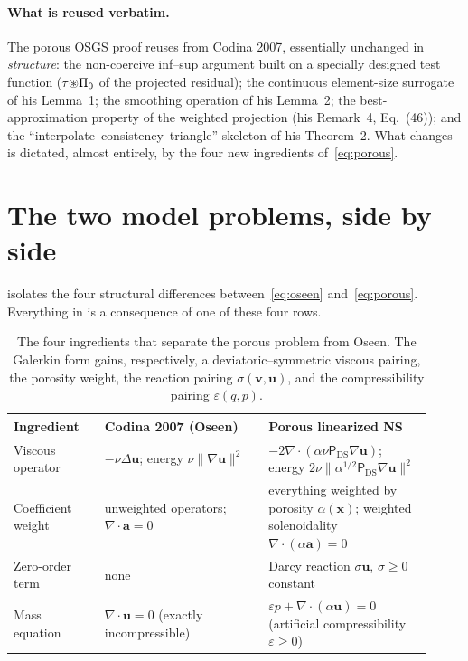 \documentclass[11pt]{article}
\theoremstyle{remark}
\newcommand{\bu}{\boldsymbol{u}}
\newcommand{\bv}{\boldsymbol{v}}
\newcommand{\ba}{\boldsymbol{a}}
\newcommand{\ViscProj}{\mathsf{P}_{\mathrm{DS}}}
\newcommand{\norm}[1]{\lVert #1 \rVert}
\newcommand{\smul}{\circledast}
\begin{document}
\paragraph{What is reused verbatim.}
The porous OSGS proof reuses from Codina 2007, essentially unchanged in \emph{structure}:
the non-coercive inf--sup argument built on a specially designed test function
($\tau\smash{\smul}\Pi_0$ of the projected residual); the continuous element-size surrogate
of his Lemma~1; the smoothing operation of his Lemma~2; the best-approximation property of
the weighted projection (his Remark~4, Eq.~(46)); and the ``interpolate--consistency--triangle''
skeleton of his Theorem~2. What changes is dictated, almost entirely, by the four new
ingredients of~\cref{eq:porous}.

\section{The two model problems, side by side}
\label{sec:models}

 isolates the four structural differences between~\cref{eq:oseen}
and~\cref{eq:porous}. Everything in  is a consequence of
one of these four rows.

\begin{table}[htbp]
\centering
\small
\renewcommand{\arraystretch}{1.35}
\begin{tabular}{@{}p{0.20\linewidth}p{0.36\linewidth}p{0.36\linewidth}@{}}
\toprule
Ingredient & Codina 2007 (Oseen) & Porous linearized NS \\
\midrule
Viscous operator
 & $-\nu\Delta\bu$; energy $\nu\norm{\nabla\bu}^2$
 & $-2\nabla\cdot(\alpha\nu\ViscProj\nabla\bu)$; energy $2\nu\norm{\alpha^{1/2}\ViscProj\nabla\bu}^2$ \\
Coefficient weight
 & unweighted operators; $\nabla\cdot\ba=0$
 & everything weighted by porosity $\alpha(\boldsymbol x)$; weighted solenoidality $\nabla\cdot(\alpha\ba)=0$ \\
Zero-order term
 & none
 & Darcy reaction $\sigma\bu$, $\sigma\ge0$ constant \\
Mass equation
 & $\nabla\cdot\bu=0$ (exactly incompressible)
 & $\varepsilon p+\nabla\cdot(\alpha\bu)=0$ (artificial compressibility $\varepsilon\ge0$) \\
\bottomrule
\end{tabular}
\caption{The four ingredients that separate the porous problem from Oseen. The Galerkin
form gains, respectively, a deviatoric--symmetric viscous pairing, the porosity weight,
the reaction pairing $\sigma(\bv,\bu)$, and the compressibility pairing
$\varepsilon(q,p)$.}
\label{tab:models}
\end{table}
\end{document}
